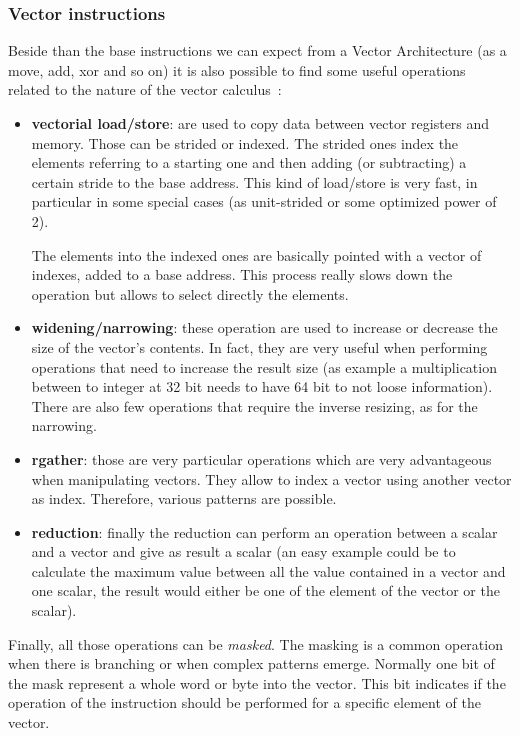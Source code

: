 \subsubsection{Vector instructions}
Beside than the base instructions we can expect from a Vector Architecture (as a move, add, xor and so on) it is also possible to find some useful operations related to the nature of the vector calculus~\cite{riscv-v-specs}:
\begin{itemize}
    \item \textbf{vectorial load/store}: are used to copy data between vector registers and memory. Those can be strided or indexed. The strided ones index the elements referring to a starting one and then adding (or subtracting) a certain stride to the base address. This kind of load/store is very fast, in particular in some special cases (as unit-strided or some optimized power of 2).
    
    The elements into the indexed ones are basically pointed with a vector of indexes, added to a base address. This process really slows down the operation but allows to select directly the elements.
    
    \item \textbf{widening/narrowing}: these operation are used to increase or decrease the size of the vector's contents. In fact, they are very useful when performing operations that need to increase the result size (as example a multiplication between to integer at 32 bit needs to have 64 bit to not loose information). There are also few operations that require the inverse resizing, as for the narrowing.
    
    \item \textbf{rgather}: those are very particular operations which are very advantageous when manipulating vectors. They allow to index a vector using another vector as index. Therefore, various patterns are possible.
    
    \item \textbf{reduction}: finally the reduction can perform an operation between a scalar and a vector and give as result a scalar (an easy example could be to calculate the maximum value between all the value contained in a vector and one scalar, the result would either be one of the element of the vector or the scalar).
    
\end{itemize}


Finally, all those operations can be \textit{masked}. The masking is a common operation when there is branching or when complex patterns emerge.
Normally one bit of the mask represent a whole word or byte into the vector. This bit indicates if the operation of the instruction should be performed for a specific element of the vector.


